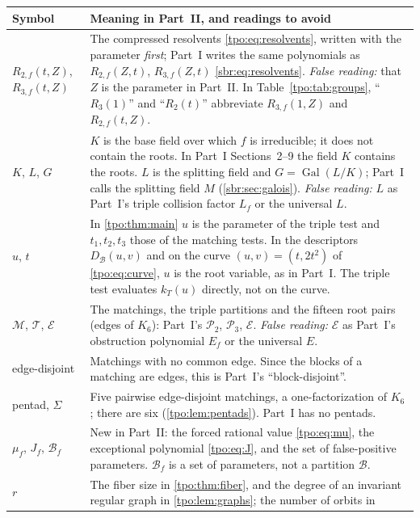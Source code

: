 \documentclass[11pt,letterpaper]{article}
\numberwithin{equation}{section}
\theoremstyle{definition}
\theoremstyle{remark}
\DeclareMathOperator{\Gal}{Gal}
\newcommand{\Ptwo}{\mathcal P_2}
\newcommand{\Pthree}{\mathcal P_3}
\newcommand{\Edges}{\mathcal E}
\newcommand{\Rtwo}{R_{2,f}}
\newcommand{\Rthree}{R_{3,f}}
\newcommand{\tpoM}{\mathcal M}
\newcommand{\tpoT}{\mathcal T}
\begin{document}
\begin{center}
\small
\begin{longtable}{@{}>{\raggedright\arraybackslash}p{}
 >{\raggedright\arraybackslash}p{}@{}}
\toprule
Symbol & Meaning in Part~II, and readings to avoid\\
\midrule
\endhead
\bottomrule
\endfoot
$\Rtwo(t,Z)$, $\Rthree(t,Z)$ & The compressed resolvents
\eqref{tpo:eq:resolvents}, written with the parameter \emph{first}; Part~I
writes the same polynomials as $\Rtwo(Z,t)$, $\Rthree(Z,t)$
\eqref{sbr:eq:resolvents}. \emph{False reading:} that $Z$ is the parameter
in Part~II. In Table~\ref{tpo:tab:groups}, ``$R_3(1)$'' and ``$R_2(t)$''
abbreviate $\Rthree(1,Z)$ and $\Rtwo(t,Z)$.\\[3pt]
$K$, $L$, $G$ & $K$ is the base field over which $f$ is irreducible; it does
not contain the roots. In Part~I Sections~2--9 the field $K$ contains the
roots. $L$ is the splitting field and $G=\Gal(L/K)$; Part~I calls the
splitting field $M$ (\cref{sbr:sec:galois}). \emph{False reading:} $L$ as
Part~I's triple collision factor $L_f$ or the universal $L$.\\[3pt]
$u$, $t$ & In \cref{tpo:thm:main} $u$ is the parameter of the triple test
and $t_1,t_2,t_3$ those of the matching tests. In the descriptors
$D_{\mathcal B}(u,v)$ and on the curve $(u,v)=(t,2t^2)$ of
\eqref{tpo:eq:curve}, $u$ is the root variable, as in Part~I. The triple
test evaluates $k_T(u)$ directly, not on the curve.\\[3pt]
$\tpoM$, $\tpoT$, $\Edges$ & The matchings, the triple partitions and the
fifteen root pairs (edges of $K_6$): Part~I's $\Ptwo$, $\Pthree$,
$\Edges$. \emph{False reading:} $\Edges$ as Part~I's obstruction polynomial
$E_f$ or the universal $E$.\\[3pt]
edge-disjoint & Matchings with no common edge. Since the blocks of a
matching are edges, this is Part~I's ``block-disjoint''.\\[3pt]
pentad, $\Sigma$ & Five pairwise edge-disjoint matchings, a
one-factorization of $K_6$; there are six (\cref{tpo:lem:pentads}). Part~I
has no pentads.\\[3pt]
$\mu_f$, $J_f$, $\mathcal B_f$ & New in Part~II: the forced rational value
\eqref{tpo:eq:mu}, the exceptional polynomial \eqref{tpo:eq:J}, and the set of
false-positive parameters. $\mathcal B_f$ is a set of parameters, not a
partition $\mathcal B$.\\[3pt]
$r$ & The fiber size in \cref{tpo:thm:fiber}, and the degree of an
invariant regular graph in \cref{tpo:lem:graphs}; the number of orbits in

\end{longtable}
\end{center}
\end{document}
